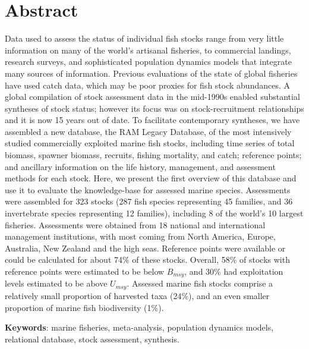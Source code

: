 \section*{Abstract}

Data used to assess the status of individual fish stocks range from
very little information on many of the world's artisanal fisheries, to
commercial landings, research surveys, and sophisticated population
dynamics models that integrate many sources of information.  Previous
evaluations of the state of global fisheries have used catch data,
which may be poor proxies for fish stock abundances. A global
compilation of stock assessment data in the mid-1990s enabled
substantial syntheses of stock status; however its focus was on
stock-recruitment relationships and it is now 15 years out of date. To
facilitate contemporary syntheses, we have assembled a new database,
the RAM Legacy Database, of the most intensively studied commercially
exploited marine fish stocks, including time series of total biomass,
spawner biomass, recruits, fishing mortality, and catch; reference
points; and ancillary information on the life history, management, and
assessment methods for each stock.  Here, we present the first
overview of this database and use it to evaluate the knowledge-base
for assessed marine species.  Assessments were assembled for
323 stocks (287 fish species
representing 45 families, and
36 invertebrate species representing
12 families), including 8 of the world's 10
largest fisheries. Assessments were obtained from 18 national and
international management institutions, with most coming from North
America, Europe, Australia, New Zealand and the high seas. Reference
points were available or could be calculated for about
74\% of these stocks. Overall, 58\% of
stocks with reference points were estimated to be below $B_{msy}$, and
30\% had exploitation levels estimated to be above $U_{msy}$.
Assessed marine fish stocks comprise a relatively small proportion of
harvested taxa (24\%), and an even smaller proportion of marine fish
biodiversity (1\%).



\noindent \textbf{Keywords}: marine fisheries, meta-analysis, population dynamics models, relational database, stock assessment, synthesis.


